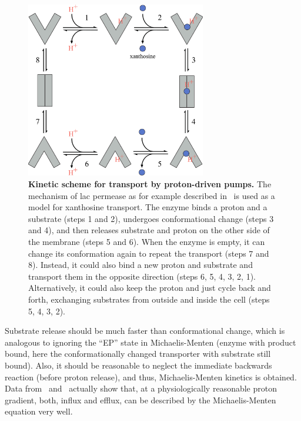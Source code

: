 \documentclass[10pt,letterpaper]{article}
\begin{document}
\begin{figure}
	\centering
	\includegraphics[width=0.7\textwidth]{FigSI2.pdf}
	\caption{{\bf Kinetic scheme for transport by proton-driven pumps.}
		The mechanism of lac permease as for example described in~\cite{Kaback2015} is used as a model for xanthosine transport. The enzyme binds a proton and a substrate (steps 1 and 2), undergoes conformational change (steps 3 and 4), and then releases substrate and proton on the other side of the membrane (steps 5 and 6). When the enzyme is empty, it can change its conformation again to repeat the transport (steps 7 and 8). Instead, it could also bind a new proton and substrate and transport them in the opposite direction (steps 6, 5, 4, 3, 2, 1). Alternatively, it could also keep the proton and just cycle back and forth, exchanging substrates from outside and inside the cell (steps 5, 4, 3, 2).}
	\label{figS2:permease}
\end{figure}

Substrate release should be much faster than conformational change, which is analogous to ignoring the ``EP'' state in Michaelis-Menten (enzyme with product bound, here the conformationally changed transporter with substrate still bound). Also, it should be reasonable to neglect the immediate backwards reaction (before proton release), and thus, Michaelis-Menten kinetics is obtained. Data from~\cite{Kaczorowski1979} and~\cite{Viitanen1984} actually show that, at a physiologically reasonable proton gradient, both, influx and efflux, can be described by the Michaelis-Menten equation very well.
\end{document}
